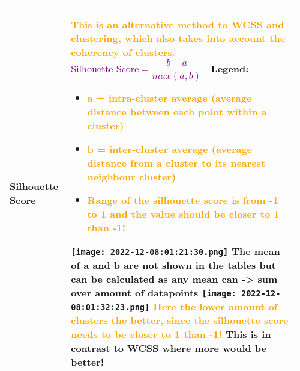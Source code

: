 \documentclass[main.tex,fontsize=8pt,paper=a4,paper=portrait,DIV=calc,]{scrartcl}
\begin{document}
\begin{table}[ht!]
\begin{tabular}{|m{0.2\linewidth}|m{0.755\linewidth}|}
\hline
Silhouette Score & 
\textcolor{orange}{This is an alternative method to WCSS and clustering, which also takes into account the coherency of clusters.}\newline
\, \newline
\large \textcolor{purple}{\( \text{Silhouette Score} = \dfrac{b - a}{max(a,b)}\)}\newline
\normalsize \, \newline
Legend: \newline
\begin{itemize}
\item \textcolor{orange}{a = intra-cluster average (average distance between each point within a cluster)}
\item \textcolor{orange}{b = inter-cluster average (average distance from a cluster to its nearest neighbour cluster)}
\item \textcolor{orange}{Range of the silhouette score is from -1 to 1 and the value should be closer to 1 than -1!}
\end{itemize} 
\texttt{[image: 2022-12-08:01:21:30.png]}\newline
The mean of a and b are not shown in the tables but can be calculated as any mean can -> sum over amount of datapoints\newline
\texttt{[image: 2022-12-08:01:32:23.png]}\newline
\textcolor{orange}{Here the lower amount of clusters the better, since the silhouette score needs to be closer to 1 than -1!}\newline
This is in contrast to WCSS where more would be better!
\\
\hline
\end{tabular}

\end{table}
\end{document}
